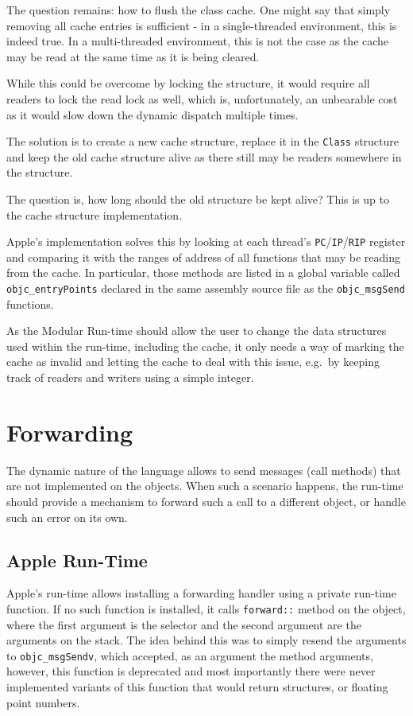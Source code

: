 The question remains: how to flush the class cache. One might say that simply removing all cache entries is sufficient - in a single-threaded environment, this is indeed true. In a multi-threaded environment, this is not the case as the cache may be read at the same time as it is being cleared.

While this could be overcome by locking the structure, it would require all readers to lock the read lock as well, which is, unfortunately, an unbearable cost as it would slow down the dynamic dispatch multiple times.

The solution is to create a new cache structure, replace it in the \verb=Class= structure and keep the old cache structure alive as there still may be readers somewhere in the structure.

The question is, how long should the old structure be kept alive? This is up to the cache structure implementation.

Apple's implementation solves this by looking at each thread's \verb=PC=/\verb=IP=/\verb=RIP= register and comparing it with the ranges of address of all functions that may be reading from the cache. In particular, those methods are listed in a global variable called \verb=objc_entryPoints= declared in the same assembly source file as the \verb=objc_msgSend= functions. 

As the Modular Run-time should allow the user to change the data structures used within the run-time, including the cache, it only needs a way of marking the cache as invalid and letting the cache to deal with this issue, e.g.\ by keeping track of readers and writers using a simple integer.

\section{Forwarding}

The dynamic nature of the language allows to send messages (call methods) that are not implemented on the objects. When such a scenario happens, the run-time should provide a mechanism to forward such a call to a different object, or handle such an error on its own.

\subsection{Apple Run-Time}

Apple's run-time allows installing a forwarding handler using a private run-time function. If no such function is installed, it calls \verb=forward::= method on the object, where the first argument is the selector and the second argument are the arguments on the stack. The idea behind this was to simply resend the arguments to \verb=objc_msgSendv=, which accepted, as an argument the method arguments, however, this function is deprecated and most importantly there were never implemented variants of this function that would return structures, or floating point numbers.

